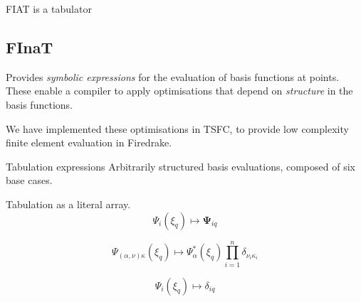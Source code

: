 \documentclass[a0paper,portrait]{baposter}
\begin{document}
\begin{poster}
\begin{posterbox}[name=introduction,span=6,column=0,row=0]{FIAT is a
      tabulator}
\begin{minipage}{0.49\textwidth}
      \subsection*{FInaT}
      \vspace{-0.5em}
      Provides \emph{symbolic expressions} for the
      evaluation of basis functions at points.  These enable a
      compiler to apply optimisations that depend on \emph{structure}
      in the basis functions.

      We have implemented these optimisations in TSFC, to provide low
      complexity finite element evaluation in Firedrake.
    \end{minipage}
  \end{posterbox}

  \begin{posterbox}[name=structure, column=0, below=introduction, span=3]{Tabulation expressions}
    Arbitrarily structured basis evaluations, composed of six base cases.
    \begin{tcbraster}[raster columns=6,raster equal height=rows]
    \begin{tcolorbox}[title=FIAT,left=0mm,right=0mm,top=0mm,bottom=0mm,boxsep=0.5mm,
      raster multicolumn=3, valign upper=center, halign=center]
      Tabulation as a literal array.
      \begin{equation*}
        \Psi_i(\xi_q) \mapsto \mathbf{\Psi}_{iq}
      \end{equation*}
    \end{tcolorbox}
    \begin{tcolorbox}[title=Tensor-valued,left=0mm,right=0mm,top=0mm,bottom=0mm,boxsep=0.5mm,
      raster multicolumn=3, valign upper=center]
      \begin{equation*}
        \Psi_{(\alpha, \nu)\kappa}(\xi_q) \mapsto \Psi_{\alpha}^*(\xi_q) \prod_{i=1}^n \delta_{\nu_i \kappa_i}
      \end{equation*}
    \end{tcolorbox}
    \begin{tcolorbox}[title=Underintegration,left=0mm,right=0mm,top=0mm,bottom=0mm,boxsep=0.5mm,
      raster multicolumn=2, valign upper=center]
      \begin{equation*}
        \Psi_i(\xi_q) \mapsto \delta_{iq}
      \end{equation*}
    \end{tcolorbox}
    \begin{tcolorbox}[title=Enriched,left=0mm,right=0mm,top=0mm,bottom=0mm,boxsep=0.5mm,
      raster multicolumn=4, valign upper=center]

\end{tcolorbox}
\end{tcbraster}
\end{posterbox}
\end{poster}
\end{document}
